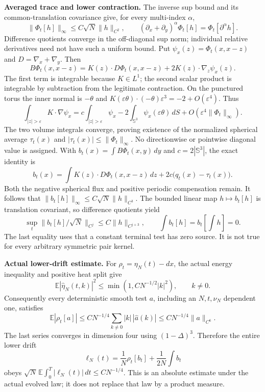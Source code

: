 \documentclass[11pt]{article}
\newcommand{\E}{\mathbb E}
\begin{document}
\noindent\textbf{Averaged trace and lower contraction.}
The inverse sup bound and its common-translation covariance give, for every multi-index $\alpha$,
\[
 \|\Phi_t[h]\|_\infty\le C\sqrt N\|h\|_{C^2},\qquad
 (\partial_x+\partial_y)^\alpha\Phi_t[h]=\Phi_t[\partial^\alpha h].
\]
Difference quotients converge in the off-diagonal sup norm; individual relative derivatives need not have such a uniform bound. Put $\psi_x(z)=\Phi_t(x,x-z)$ and $D=\nabla_x+\nabla_y$. Then
\[
 B\Phi_t(x,x-z)=K(z)\cdot D\Phi_t(x,x-z)+2K(z)\cdot\nabla_z\psi_x(z).
\]
The first term is integrable because $K\in L^1$; the second scalar product is integrable by subtraction from the legitimate contraction. On the punctured torus the inner normal is $-\theta$ and $K(\varepsilon\theta)\cdot(-\theta)\varepsilon^3=-2+O(\varepsilon^4)$. Thus
\[
 \int_{|z|>\varepsilon}K\cdot\nabla\psi_x
 =c\int_{|z|>\varepsilon}\psi_x
 -2\int_{\mathbb S^3}\psi_x(\varepsilon\theta)\,dS
 +O(\varepsilon^4\|\Phi_t\|_\infty).
\]
The two volume integrals converge, proving existence of the normalized spherical average $\tau_t(x)$ and $|\tau_t(x)|\le\|\Phi_t\|_\infty$. No directionwise or pointwise diagonal value is assigned. With $b_t(x)=\int B\Phi_t(x,y)\,dy$ and $c=2|\mathbb S^3|$, the exact identity is
\[
 b_t(x)=\int K(z)\cdot D\Phi_t(x,x-z)\,dz+2c\bigl(q_t(x)-\tau_t(x)\bigr).
\]
Both the negative spherical flux and positive periodic compensation remain. It follows that $\|b_t[h]\|_\infty\le C\sqrt N\|h\|_{C^3}$. The bounded linear map $h\mapsto b_t[h]$ is translation covariant, so difference quotients yield
\[
 \sup_t\|b_t[h]/\sqrt N\|_{C^j}\le C\|h\|_{C^{j+3}},\qquad
 \int b_t[h]=b_t[\textstyle\int h]=0.
\]
The last equality uses that a constant terminal test has zero source. It is not true for every arbitrary symmetric pair kernel.

\newpage
\noindent\textbf{Actual lower-drift estimate.}
For $\rho_t=\eta_N(t)-dx$, the actual energy inequality and positive heat split give
\[
 \E|\widehat\eta_N(t,k)|^2\le\min(1,CN^{-1/2}|k|^2),\qquad k\ne0.
\]
Consequently every deterministic smooth test $a$, including an $N,t,\nu_N$ dependent one, satisfies
\[
 \E|\rho_t[a]|\le C N^{-1/4}\sum_{k\ne0}|k|\,|\widehat a(k)|
 \le C N^{-1/4}\|a\|_{C^6}.
\]
The last series converges in dimension four using $(1-\Delta)^3$. Therefore the entire lower drift
\[
 \ell_N(t)=\frac1N\rho_t[b_t]+\frac1{2N}\int b_t
\]
obeys $\sqrt N\,\E\int_0^T|\ell_N(t)|\,dt\le C N^{-1/4}$. This is an absolute estimate under the actual evolved law; it does not replace that law by a product measure.
\end{document}
